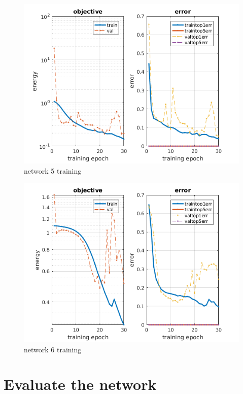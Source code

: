 \documentclass[]{report}
\begin{document}
\begin{figure}[h]
	\begin{center}
		\includegraphics[scale=0.8]{init_5.png}
		\caption{network 5 training}
		\label{fig:training5}
	\end{center}
\end{figure}

\begin{figure}[h]
	\begin{center}
		\includegraphics[scale=0.8]{init_6.png}
		\caption{network 6 training}
		\label{fig:training6}
	\end{center}
\end{figure}

\chapter{Evaluate the network}
\end{document}
